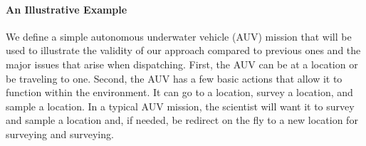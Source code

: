 
\paragraph{An Illustrative Example} We define a simple autonomous underwater vehicle (AUV) mission
that will be used to illustrate the validity of our approach compared to previous ones and the major issues that
arise when dispatching. First, the AUV can be at a location or be
traveling to one. Second, the AUV has a few basic actions that allow it to function within the environment. 
It can go to a location, survey a location, and sample a location. In a typical AUV mission,
the scientist will want it to survey and sample a location and, if needed, be redirect on the fly to a new
location for surveying and surveying. 

